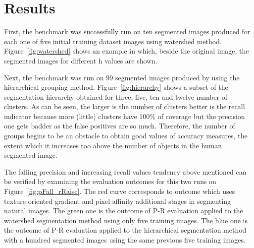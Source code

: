 \documentclass[10pt,twocolumn,letterpaper]{article}
\begin{document}
\section{Results}
 
First, the benchmark was successfully run on ten segmented images produced for each one of five initial training dataset images using watershed method. Figure~\ref{fig:watershed} shows  an example in which, beside the original image, the segmented images for different h values are shown.

Next, the benchmark was run on 99 segmented images produced by using the hierarchical grouping method. Figure~\ref{fig:hierarchy} shows a subset of the segmentation hierarchy obtained for three, five, ten and twelve number of clusters. As can be seen, the larger is the number of clusters better is the recall indicator because more (little) clusters have 100\% of coverage but the precision one gets badder as the false positives are so much. Therefore, the number of groups begins to be an obstacle to obtain good values of accuracy measures, the extent which it increases too above the number of objects in the human segmented image. 

The falling precision and increasing recall values tendency above mentioned can be verified by examining the evaluation outcomes for this two runs on Figure~\ref{fig:pFall_rRaise}. The red curve corresponds to \cite{Arbelaez2011} outcome which uses texture oriented gradient and pixel affinity additional stages in segmenting natural images. The green one is the outcome of P-R evaluation applied to the watershed segmentation method using only five training images. The blue one is the outcome of P-R evaluation  applied to the hierarchical segmentation method with a hundred segmented images using the same previous five training images. 
\end{document}
